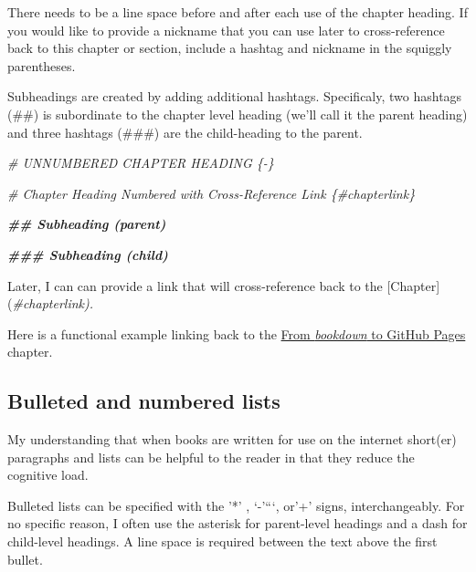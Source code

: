 \documentclass[
]{book}
\newenvironment{Shaded}{\begin{snugshade}}{\end{snugshade}}
\newcommand{\CommentTok}[1]{\textcolor[rgb]{0.56,0.35,0.01}{\textit{#1}}}
\newcommand{\DocumentationTok}[1]{\textcolor[rgb]{0.56,0.35,0.01}{\textbf{\textit{#1}}}}
\newcommand{\NormalTok}[1]{#1}
\newcommand{\SpecialCharTok}[1]{\textcolor[rgb]{0.00,0.00,0.00}{#1}}
\begin{document}
There needs to be a line space before and after each use of the chapter heading. If you would like to provide a nickname that you can use later to cross-reference back to this chapter or section, include a hashtag and nickname in the squiggly parentheses.

Subheadings are created by adding additional hashtags. Specificaly, two hashtags (\#\#) is subordinate to the chapter level heading (we'll call it the parent heading) and three hashtags (\#\#\#) are the child-heading to the parent.

\begin{Shaded}
\begin{Highlighting}[]
\CommentTok{\# UNNUMBERED CHAPTER HEADING \{{-}\}}

\CommentTok{\# Chapter Heading Numbered with Cross{-}Reference Link \{\#chapterlink\}}

\DocumentationTok{\#\# Subheading (parent)}

\DocumentationTok{\#\#\# Subheading (child)}
\end{Highlighting}
\end{Shaded}

\begin{Shaded}
\begin{Highlighting}[]
\NormalTok{Later, I can can provide a link that will cross}\SpecialCharTok{{-}}\NormalTok{reference back to the [Chapter](}\CommentTok{\#chapterlink).}
\end{Highlighting}
\end{Shaded}

Here is a functional example linking back to the \protect\hyperlink{book1}{From \emph{bookdown} to GitHub Pages} chapter.

\hypertarget{bulleted-and-numbered-lists}{%
\subsection{Bulleted and numbered lists}\label{bulleted-and-numbered-lists}}

My understanding that when books are written for use on the internet short(er) paragraphs and lists can be helpful to the reader in that they reduce the cognitive load.

Bulleted lists can be specified with the '*' , `-'```, or'+' signs, interchangeably. For no specific reason, I often use the asterisk for parent-level headings and a dash for child-level headings. A line space is required between the text above the first bullet.
\end{document}
